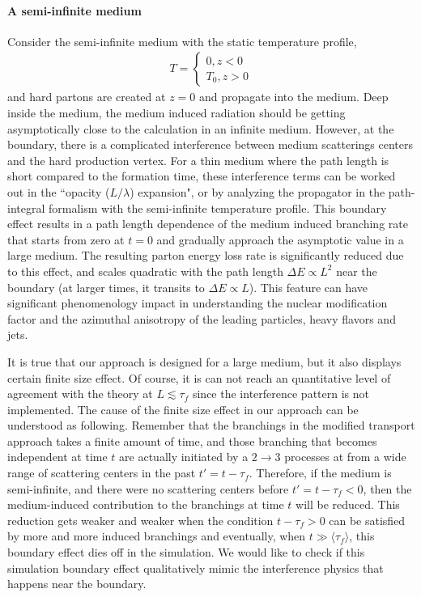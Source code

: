 \paragraph{A semi-infinite medium}
Consider the semi-infinite medium with the static temperature profile,
\begin{eqnarray}
T = \begin{cases}
0 , z<0\\
T_0, z>0
\end{cases}
\end{eqnarray}
and hard partons are created at $z=0$ and propagate into the medium.
Deep inside the medium, the medium induced radiation should be getting asymptotically close to the calculation in an infinite medium.
However, at the boundary, there is a complicated interference between medium scatterings centers and the hard production vertex.
For a thin medium where the path length is short compared to the formation time, these interference terms can be worked out in the ``opacity ($L/\lambda$) expansion", or by analyzing the propagator in the path-integral formalism with the semi-infinite temperature profile.
This boundary effect results in a path length dependence of the medium induced branching rate that starts from zero at $t=0$ and gradually approach the asymptotic value in a large medium.
The resulting parton energy loss rate is significantly reduced due to this effect, and scales quadratic with the path length $\Delta E \propto L^2$ near the boundary (at larger times, it transits to $\Delta E \propto L$).
This feature can have significant phenomenology impact in understanding the nuclear modification factor and the azimuthal anisotropy of the leading particles, heavy flavors and jets.

It is true that our approach is designed for a large medium, but it also displays certain finite size effect. 
Of course, it is can not reach an quantitative level of agreement with the theory at $L \lesssim \tau_f$ since the interference pattern is not implemented.
The cause of the finite size effect in our approach can be understood as following.
Remember that the branchings in the modified transport approach takes a finite amount of time, and those branching that becomes independent at time $t$ are actually initiated by a $2\rightarrow 3$ processes at from a wide range of scattering centers in the past $t' = t - \tau_f$.
Therefore, if the medium is semi-infinite, and there were no scattering centers before $t' = t-\tau_f < 0$, then the medium-induced contribution to the branchings at time $t$ will be reduced.
This reduction gets weaker and weaker when the condition $t-\tau_f > 0$ can be satisfied by more and more induced branchings and eventually, when $t\gg \langle \tau_f\rangle$, this boundary effect dies off in the simulation. 
We would like to check if this simulation boundary effect qualitatively mimic the interference physics that happens near the boundary.


